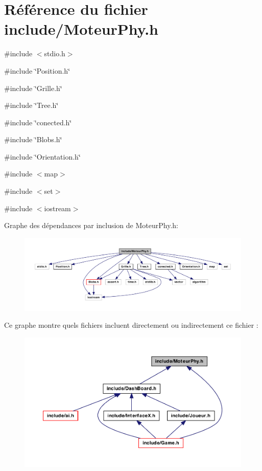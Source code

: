 \hypertarget{a00031}{
\section{Référence du fichier include/MoteurPhy.h}
\label{a00031}
}
{\ttfamily \#include $<$stdio.h$>$}\par
{\ttfamily \#include \char`\"{}Position.h\char`\"{}}\par
{\ttfamily \#include \char`\"{}Grille.h\char`\"{}}\par
{\ttfamily \#include \char`\"{}Tree.h\char`\"{}}\par
{\ttfamily \#include \char`\"{}conected.h\char`\"{}}\par
{\ttfamily \#include \char`\"{}Blobs.h\char`\"{}}\par
{\ttfamily \#include \char`\"{}Orientation.h\char`\"{}}\par
{\ttfamily \#include $<$map$>$}\par
{\ttfamily \#include $<$set$>$}\par
{\ttfamily \#include $<$iostream$>$}\par
Graphe des dépendances par inclusion de MoteurPhy.h:
\nopagebreak
\begin{figure}[H]
\begin{center}
\leavevmode
\includegraphics[width=400pt]{a00063}
\end{center}
\end{figure}
Ce graphe montre quels fichiers incluent directement ou indirectement ce fichier :
\nopagebreak
\begin{figure}[H]
\begin{center}
\leavevmode
\includegraphics[width=400pt]{a00064}
\end{center}
\end{figure}
